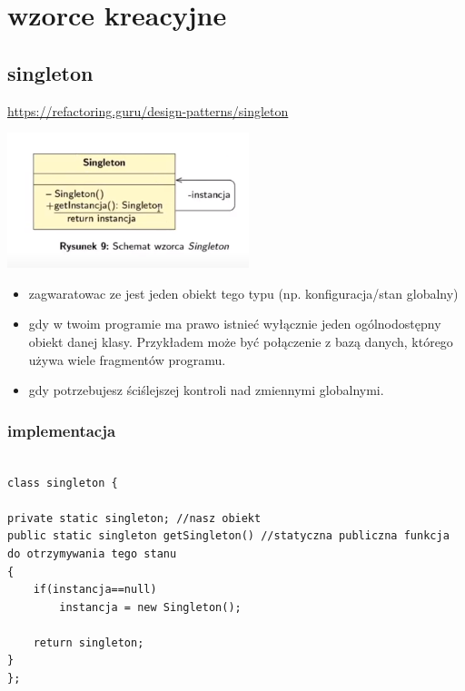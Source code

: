 \documentclass[11pt]{article}
\begin{document}
\section{wzorce kreacyjne}
\label{sec:orgd25f88e}
\subsection{singleton}
\label{sec:orgb504d1a}
\url{https://refactoring.guru/design-patterns/singleton}

\begin{center}
\includegraphics[width=.9\linewidth]{./singleton.png}
\end{center}
\begin{itemize}
\item zagwaratowac ze jest jeden obiekt tego typu (np. konfiguracja/stan globalny)
\item gdy w twoim programie ma prawo istnieć wyłącznie jeden ogólnodostępny obiekt danej klasy. Przykładem może być połączenie z bazą danych, którego używa wiele fragmentów programu.
\item gdy potrzebujesz ściślejszej kontroli nad zmiennymi globalnymi.
\end{itemize}
\subsubsection{implementacja}
\label{sec:org50a55a8}
\begin{verbatim}

class singleton {

private static singleton; //nasz obiekt
public static singleton getSingleton() //statyczna publiczna funkcja do otrzymywania tego stanu
{
	if(instancja==null)
		instancja = new Singleton();

	return singleton;
}
};

\end{verbatim}
\end{document}
